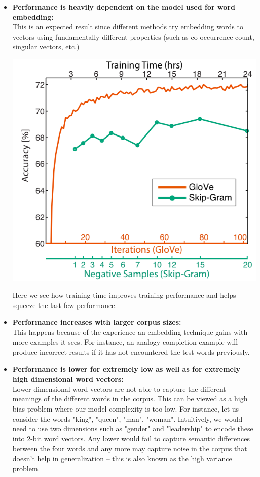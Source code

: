 \documentclass{tufte-handout}
\begin{document}
\begin{itemize}
\item \textbf{Performance is heavily dependent on the model used for word embedding:}\\ This is an expected result since different methods try embedding words to vectors using fundamentally different properties (such as co-occurrence count, singular vectors, etc.) 


\begin{marginfigure}%
  \includegraphics[width=\linewidth]{TrainTime}
  \caption{Here we see how training time improves training performance and helps squeeze the last few performance.}
  \label{fig:IntrinsicEval}
\end{marginfigure}


\item \textbf{Performance increases with larger corpus sizes:}\\ This happens because of the experience an embedding technique gains with more examples it sees. For instance, an analogy completion example will produce incorrect results if it has not encountered the test words previously.


\item \textbf{Performance is lower for extremely low as well as for extremely high dimensional word vectors:}\\ Lower dimensional word vectors are not able to capture the different meanings of the different words in the corpus. This can be viewed as a high bias problem where our model complexity is too low. For instance, let us consider the words "king", "queen", "man", "woman". Intuitively, we would need to use two dimensions such as "gender" and "leadership" to encode these into 2-bit word vectors. Any lower would fail to capture semantic differences between the four words and any more may capture noise in the corpus that doesn't help in generalization -- this is also known as the high variance problem.
\end{itemize}
\end{document}
